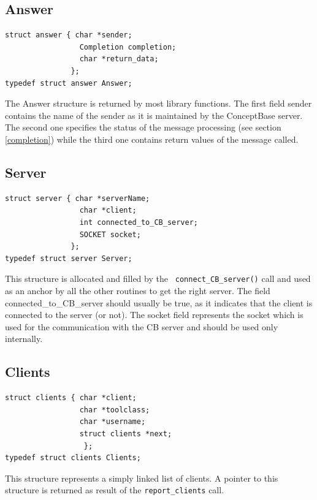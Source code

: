 \subsection{Answer}

\begin{verbatim}
struct answer { char *sender;
                 Completion completion;
                 char *return_data;
               };
typedef struct answer Answer;
\end{verbatim}

The {\ttfamily Answer} structure is returned by most library functions.
The first field {\ttfamily sender} contains the name of the sender
as it is maintained by the ConceptBase server. The second one specifies the
status of the message processing (see section \ref{completion})
while the third one contains return values of the message called.
\subsection{Server}

\begin{verbatim}
struct server { char *serverName;
                 char *client;
                 int connected_to_CB_server;
                 SOCKET socket;
               };
typedef struct server Server;
\end{verbatim}

This structure is allocated and filled by the {\tt
  connect\_CB\_server()} call and used as an anchor by all the other
routines to get the right server. The field
{\ttfamily connected\_to\_CB\_server} should usually be true,
as it indicates that the client is connected to the server (or not).
The {\ttfamily socket} field represents the socket which is used
for the communication with the CB server and should be used only
internally.

\subsection{Clients}

\begin{verbatim}
struct clients { char *client;
                 char *toolclass;
                 char *username;
                 struct clients *next;
                  };
typedef struct clients Clients;
\end{verbatim}

This structure represents a simply linked list of clients.
A pointer to this structure is returned as result of the {\tt report\_clients} call.

